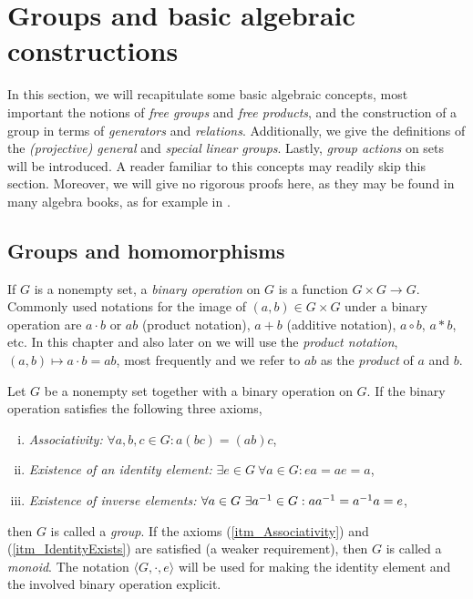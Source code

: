 \section{Groups and basic algebraic constructions}

In this section, we will recapitulate some basic algebraic concepts, most important the notions of \emph{free groups} and \emph{free products}, and the construction of a group in terms of \emph{generators} and \emph{relations}. Additionally, we give the definitions of the \emph{(projective) general} and \emph{special linear groups}. Lastly, \emph{group actions} on sets will be introduced. A reader familiar to this concepts may readily skip this section. Moreover, we will give no rigorous proofs here, as they may be found in many algebra books, as for example in \Hungerford.

\subsection{Groups and homomorphisms}

If $G$ is a nonempty set, a \emph{binary operation} on $G$ is a function $G \times G \to G$. Commonly used notations for the image of $(a,b) \in G \times G$ under a binary operation are $a \cdot b$ or $ab$ (product notation), $a + b$ (additive notation), $a \circ b$, $a \ast b$, etc. In this chapter and also later on we will use the \emph{product notation}, $(a,b) \mapsto a \cdot b =  ab$, most frequently and we refer to $ab$ as the \emph{product} of $a$ and $b$.

\begin{definition}
\label{dfn_GroupMonoid}
Let $G$ be a nonempty set together with a binary operation on $G$. If the binary operation satisfies the following three axioms,
\begin{enumerate}[(i)]
\item \label{itm_Associativity} \emph{Associativity:} $\forall a,b,c \in G: a(bc) = (ab)c$,
\item \label{itm_IdentityExists} \emph{Existence of an identity element:} $\exists e \in G\ \forall a \in G: ea = ae = a$,
\item \emph{Existence of inverse elements:} $\forall a \in G\ \exists {a}^{-1} \in G: a {a}^{-1} = {a}^{-1} a = e$,
\end{enumerate}
then $G$ is called a \emph{group}. If the axioms (\ref{itm_Associativity}) and (\ref{itm_IdentityExists}) are satisfied (a weaker requirement), then $G$ is called a \emph{monoid}. The notation $\langle G,\cdot,e \rangle$ will be used for making the identity element and the involved binary operation explicit.
\end{definition}

